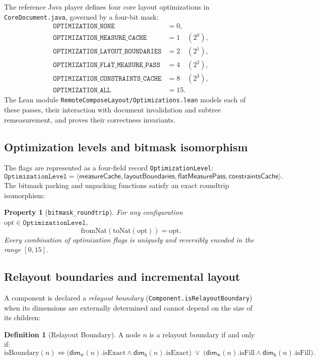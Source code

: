 \documentclass[11pt,a4paper]{article}
\newcommand{\Dimw}{\mathsf{dim}_{\mathrm{w}}}
\newcommand{\Dimh}{\mathsf{dim}_{\mathrm{h}}}
\newcommand{\lo}[1]{\texttt{#1}}       %
\newcommand{\jv}[1]{\texttt{#1}}       %
\newcommand{\file}[1]{\texttt{#1}}
\theoremstyle{definition}
\newtheorem{definition}{Definition}[section]
\theoremstyle{plain}
\newtheorem{property}{Property}[section]
\theoremstyle{remark}
\begin{document}
The reference Java player defines four core layout optimizations in
\jv{CoreDocument.java}, governed by a four-bit mask:
\begin{align*}
  \jv{OPTIMIZATION\_NONE}               &= 0, \\
  \jv{OPTIMIZATION\_MEASURE\_CACHE}       &= 1 \quad (2^0), \\
  \jv{OPTIMIZATION\_LAYOUT\_BOUNDARIES}  &= 2 \quad (2^1), \\
  \jv{OPTIMIZATION\_FLAT\_MEASURE\_PASS} &= 4 \quad (2^2), \\
  \jv{OPTIMIZATION\_CONSTRAINTS\_CACHE}  &= 8 \quad (2^3), \\
  \jv{OPTIMIZATION\_ALL}                 &= 15.
\end{align*}
The Lean module \file{RemoteComposeLayout/Optimizations.lean} models each of
these passes, their interaction with document invalidation and subtree
remeasurement, and proves their correctness invariants.

\subsection{Optimization levels and bitmask isomorphism}

The flags are represented as a four-field record \lo{OptimizationLevel}:
\[
  \lo{OptimizationLevel} = \langle \textsf{measureCache}, \textsf{layoutBoundaries},
  \textsf{flatMeasurePass}, \textsf{constraintsCache} \rangle.
\]
The bitmask packing and unpacking functions satisfy an exact roundtrip isomorphism:

\begin{property}[\lo{bitmask\_roundtrip}]
For any configuration $\mathrm{opt} \in \lo{OptimizationLevel}$,
\[
  \mathrm{fromNat}(\mathrm{toNat}(\mathrm{opt})) = \mathrm{opt}.
\]
Every combination of optimization flags is uniquely and reversibly encoded in the
range $[0, 15]$.
\end{property}

\subsection{Relayout boundaries and incremental layout}
\label{sec:opt-boundaries}

A component is declared a \emph{relayout boundary}
(\jv{Component.isRelayoutBoundary}) when its dimensions are externally
determined and cannot depend on the size of its children:
\begin{definition}[Relayout Boundary]
A node $n$ is a relayout boundary if and only if:
\[
  \mathrm{isBoundary}(n) \iff
  \bigl(\Dimw(n).\mathrm{isExact} \land \Dimh(n).\mathrm{isExact}\bigr) \;\lor\;
  \bigl(\Dimw(n).\mathrm{isFill} \land \Dimh(n).\mathrm{isFill}\bigr).
\]
\end{definition}
\end{document}
